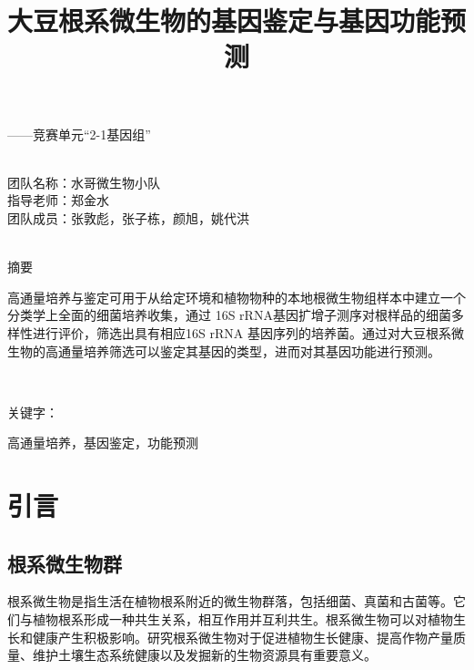 \documentclass{ctexart}
\author{}
\date{}
\title{\vspace*{-1.5cm} \CJKfontspec{SimHei}大豆根系微生物的基因鉴定与基因功能预测}
\begin{document}
    \maketitle\thispagestyle{fancy}
    \vspace*{-1.5cm}

    \raggedleft
    { \heiti  ——竞赛单元“2-1基因组”}

    ~\\

    \raggedleft
        团队名称：水哥微生物小队\\
        指导老师：郑金水\\
        团队成员：张敦彪，张子栋，颜旭，姚代洪\\
    
    ~\\

    \raggedright
    { \heiti 摘要}

    { \qquad 高通量培养与鉴定可用于从给定环境和植物物种的本地根微生物组样本中建立一个分类学上全面的细菌培养收集，通过 16S rRNA基因扩增子测序对根样品的细菌多样性进行评价，筛选出具有相应16S rRNA 基因序列的培养菌。通过对大豆根系微生物的高通量培养筛选可以鉴定其基因的类型，进而对其基因功能进行预测。}
    
    ~\\

    {\heiti {} \raggedright 关键字：} { 高通量培养，基因鉴定，功能预测}

    




    \section{引言}

    \subsection{根系微生物群}

    \qquad 根系微生物是指生活在植物根系附近的微生物群落，包括细菌、真菌和古菌等。它们与植物根系形成一种共生关系，相互作用并互利共生。根系微生物可以对植物生长和健康产生积极影响。研究根系微生物对于促进植物生长健康、提高作物产量质量、维护土壤生态系统健康以及发掘新的生物资源具有重要意义。
\end{document}
